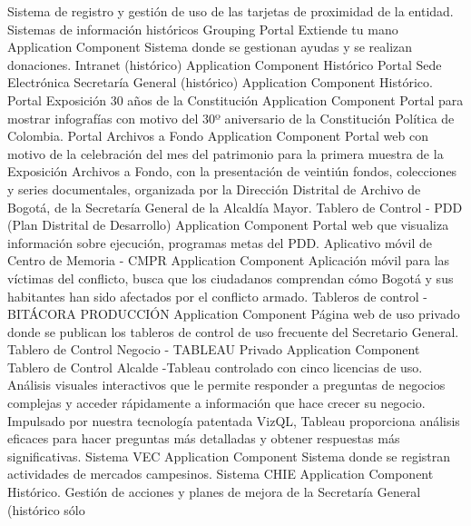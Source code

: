 \documentclass[
	a4paper, %
	12pt, %
]{include/CSSullivanBusinessReport}
\begin{document}
Sistema de registro y gestión de uso de las tarjetas de proximidad de la
entidad. \textbar{} \textbar{} Sistemas de información históricos
\textbar{} Grouping \textbar{} \textbar{} \textbar{} Portal Extiende tu
mano \textbar{} Application Component \textbar{} Sistema donde se
gestionan ayudas y se realizan donaciones. \textbar{} \textbar{}
Intranet (histórico) \textbar{} Application Component \textbar{}
Histórico \textbar{} \textbar{} Portal Sede Electrónica Secretaría
General (histórico) \textbar{} Application Component \textbar{}
Histórico. \textbar{} \textbar{} Portal Exposición 30 años de la
Constitución \textbar{} Application Component \textbar{} Portal para
mostrar infografías con motivo del 30º aniversario de la Constitución
Política de Colombia. \textbar{} \textbar{} Portal Archivos a Fondo
\textbar{} Application Component \textbar{} Portal web con motivo de la
celebración del mes del patrimonio para la primera muestra de la
Exposición Archivos a Fondo, con la presentación de veintiún fondos,
colecciones y series documentales, organizada por la Dirección Distrital
de Archivo de Bogotá, de la Secretaría General de la Alcaldía Mayor.
\textbar{} \textbar{} Tablero de Control - PDD (Plan Distrital de
Desarrollo) \textbar{} Application Component \textbar{} Portal web que
visualiza información sobre ejecución, programas metas del PDD.
\textbar{} \textbar{} Aplicativo móvil de Centro de Memoria - CMPR
\textbar{} Application Component \textbar{} Aplicación móvil para las
víctimas del conflicto, busca que los ciudadanos comprendan cómo Bogotá
y sus habitantes han sido afectados por el conflicto armado. \textbar{}
\textbar{} Tableros de control - BITÁCORA PRODUCCIÓN \textbar{}
Application Component \textbar{} Página web de uso privado donde se
publican los tableros de control de uso frecuente del Secretario
General. \textbar{} \textbar{} Tablero de Control Negocio - TABLEAU
Privado \textbar{} Application Component \textbar{} Tablero de Control
Alcalde -Tableau controlado con cinco licencias de uso. Análisis
visuales interactivos que le permite responder a preguntas de negocios
complejas y acceder rápidamente a información que hace crecer su
negocio. Impulsado por nuestra tecnología patentada VizQL, Tableau
proporciona análisis eficaces para hacer preguntas más detalladas y
obtener respuestas más significativas. \textbar{} \textbar{} Sistema VEC
\textbar{} Application Component \textbar{} Sistema donde se registran
actividades de mercados campesinos. \textbar{} \textbar{} Sistema CHIE
\textbar{} Application Component \textbar{} Histórico. Gestión de
acciones y planes de mejora de la Secretaría General (histórico sólo
\end{document}
